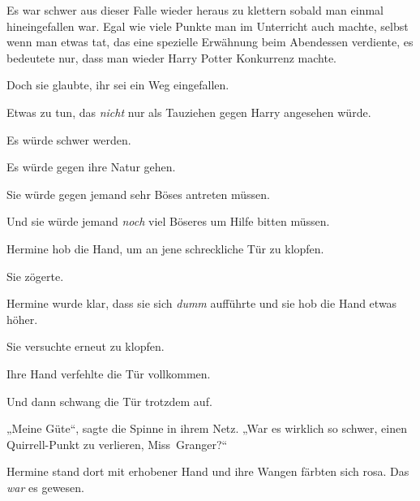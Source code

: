 Es war schwer aus dieser Falle wieder heraus zu klettern sobald man einmal hineingefallen war. Egal wie viele Punkte man im Unterricht auch machte, selbst wenn man etwas tat, das eine spezielle Erwähnung beim Abendessen verdiente, es bedeutete nur, dass man wieder Harry Potter Konkurrenz machte.

Doch sie glaubte, ihr sei ein Weg eingefallen.

Etwas zu tun, das \emph{nicht} nur als Tauziehen gegen Harry angesehen würde.

Es würde schwer werden.

Es würde gegen ihre Natur gehen.

Sie würde gegen jemand sehr Böses antreten müssen.

Und sie würde jemand \emph{noch} viel Böseres um Hilfe bitten müssen.

Hermine hob die Hand, um an jene schreckliche Tür zu klopfen.

Sie zögerte.

Hermine wurde klar, dass sie sich \emph{dumm} aufführte und sie hob die Hand etwas höher.

Sie versuchte erneut zu klopfen.

Ihre Hand verfehlte die Tür vollkommen.

Und dann schwang die Tür trotzdem auf.

„Meine Güte“, sagte die Spinne in ihrem Netz. „War es wirklich so schwer, einen Quirrell-Punkt zu verlieren, Miss~Granger?“

Hermine stand dort mit erhobener Hand und ihre Wangen färbten sich rosa. Das \emph{war} es gewesen.

